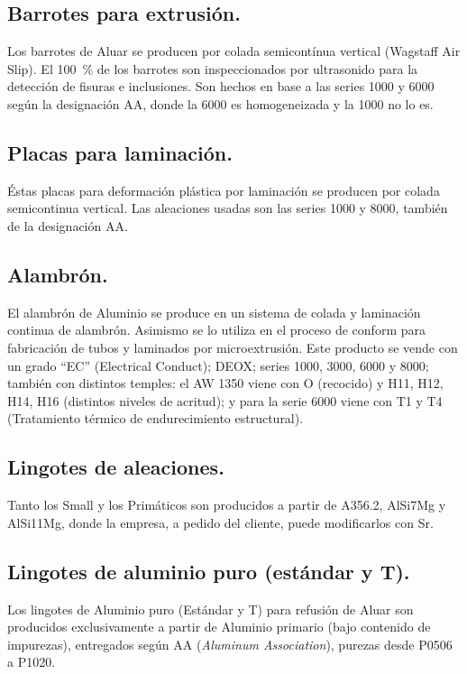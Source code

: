 \documentclass[12pt,a4paper]{article}
\begin{document}
\subsection{Barrotes para extrusión.}

Los barrotes de Aluar se producen por colada semicontínua vertical (Wagstaff Air Slip). El \SI{100}{\percent} de los barrotes son inspeccionados por ultrasonido para la detección de fisuras e inclusiones. Son hechos en base a las series 1000 y 6000 según la designación AA, donde la 6000 es homogeneizada y la 1000 no lo es.

\subsection{Placas para laminación.}

Éstas placas para deformación plástica por laminación se producen por colada semicontinua vertical. Las aleaciones usadas son las series 1000 y 8000, también de la designación AA.

\subsection{Alambrón.}

El alambrón de Aluminio se produce en un sistema de colada y laminación continua de alambrón. Asimismo se lo utiliza en el proceso de conform para fabricación de tubos y laminados por microextrusión. Este producto se vende con un grado \enquote{EC} (Electrical Conduct); DEOX; series 1000, 3000, 6000 y 8000; también con distintos temples: el AW 1350 viene con O (recocido) y H11, H12, H14, H16 (distintos niveles de acritud); y para la serie 6000 viene con T1 y T4 (Tratamiento térmico de endurecimiento estructural).

\subsection{Lingotes de aleaciones.}

Tanto los Small y los Primáticos son producidos a partir de A356.2, AlSi7Mg y AlSi11Mg, donde la empresa, a pedido del cliente, puede modificarlos con Sr.

\subsection{Lingotes de aluminio puro (estándar y T).}

Los lingotes de Aluminio puro (Estándar y T) para refusión de Aluar son producidos exclusivamente a partir de Aluminio primario (bajo contenido de impurezas), entregados según AA (\textit{Aluminum Association}), purezas desde P0506 a P1020.
\end{document}
